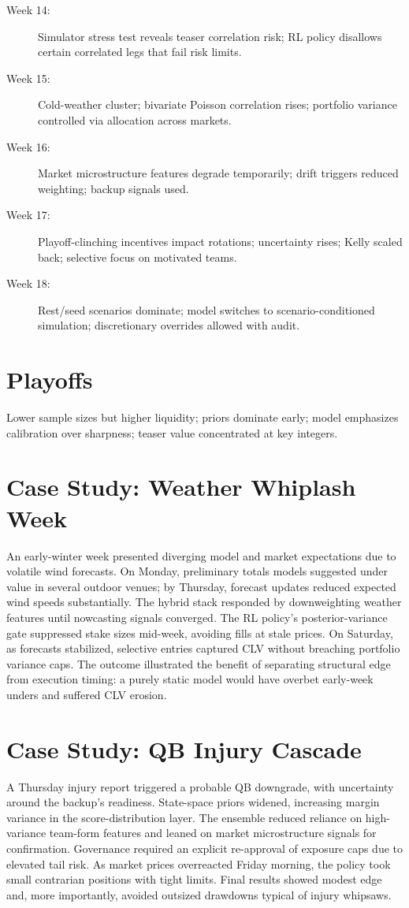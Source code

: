\documentclass[12pt]{report}  %
\numberwithin{equation}{section}
\theoremstyle{plain}
\theoremstyle{definition}
\theoremstyle{remark}
\begin{document}
\begin{description}
  \item[Week 14:] Simulator stress test reveals teaser correlation risk; RL policy disallows certain correlated legs that fail risk limits.
  \item[Week 15:] Cold-weather cluster; bivariate Poisson correlation rises; portfolio variance controlled via allocation across markets.
  \item[Week 16:] Market microstructure features degrade temporarily; drift triggers reduced weighting; backup signals used.
  \item[Week 17:] Playoff-clinching incentives impact rotations; uncertainty rises; Kelly scaled back; selective focus on motivated teams.
  \item[Week 18:] Rest/seed scenarios dominate; model switches to scenario-conditioned simulation; discretionary overrides allowed with audit.
\end{description}

\section{Playoffs}
Lower sample sizes but higher liquidity; priors dominate early; model emphasizes calibration over sharpness; teaser value concentrated at key integers.

\section{Case Study: Weather Whiplash Week}
An early-winter week presented diverging model and market expectations due to volatile wind forecasts. On Monday, preliminary totals models suggested under value in several outdoor venues; by Thursday, forecast updates reduced expected wind speeds substantially. The hybrid stack responded by downweighting weather features until nowcasting signals converged. The RL policy’s posterior-variance gate suppressed stake sizes mid-week, avoiding fills at stale prices. On Saturday, as forecasts stabilized, selective entries captured CLV without breaching portfolio variance caps. The outcome illustrated the benefit of separating structural edge from execution timing: a purely static model would have overbet early-week unders and suffered CLV erosion.

\section{Case Study: QB Injury Cascade}
A Thursday injury report triggered a probable QB downgrade, with uncertainty around the backup’s readiness. State-space priors widened, increasing margin variance in the score-distribution layer. The ensemble reduced reliance on high-variance team-form features and leaned on market microstructure signals for confirmation. Governance required an explicit re-approval of exposure caps due to elevated tail risk. As market prices overreacted Friday morning, the policy took small contrarian positions with tight limits. Final results showed modest edge and, more importantly, avoided outsized drawdowns typical of injury whipsaws.
\end{document}
